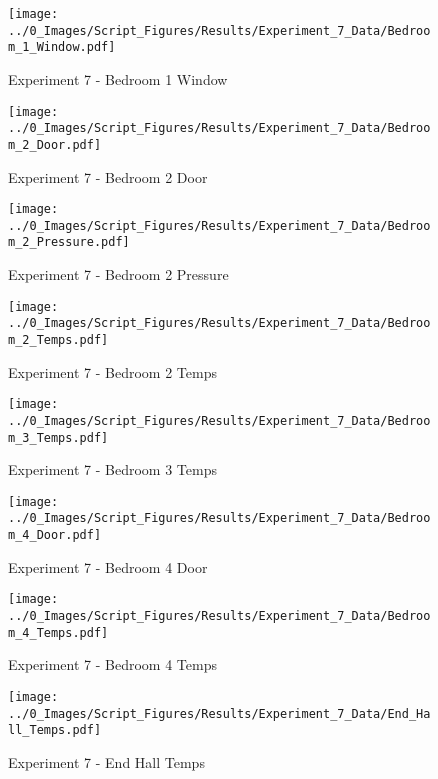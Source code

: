 	\clearpage

	\begin{figure}[H]
		\centering
		\texttt{[image: ../0\_Images/Script\_Figures/Results/Experiment\_7\_Data/Bedroom\_1\_Window.pdf]}
		\caption[]{Experiment 7 - Bedroom 1 Window}
	\end{figure}
 

	\begin{figure}[H]
		\centering
		\texttt{[image: ../0\_Images/Script\_Figures/Results/Experiment\_7\_Data/Bedroom\_2\_Door.pdf]}
		\caption[]{Experiment 7 - Bedroom 2 Door}
	\end{figure}
 
	\clearpage

	\begin{figure}[H]
		\centering
		\texttt{[image: ../0\_Images/Script\_Figures/Results/Experiment\_7\_Data/Bedroom\_2\_Pressure.pdf]}
		\caption[]{Experiment 7 - Bedroom 2 Pressure}
	\end{figure}
 

	\begin{figure}[H]
		\centering
		\texttt{[image: ../0\_Images/Script\_Figures/Results/Experiment\_7\_Data/Bedroom\_2\_Temps.pdf]}
		\caption[]{Experiment 7 - Bedroom 2 Temps}
	\end{figure}
 
	\clearpage

	\begin{figure}[H]
		\centering
		\texttt{[image: ../0\_Images/Script\_Figures/Results/Experiment\_7\_Data/Bedroom\_3\_Temps.pdf]}
		\caption[]{Experiment 7 - Bedroom 3 Temps}
	\end{figure}
 

	\begin{figure}[H]
		\centering
		\texttt{[image: ../0\_Images/Script\_Figures/Results/Experiment\_7\_Data/Bedroom\_4\_Door.pdf]}
		\caption[]{Experiment 7 - Bedroom 4 Door}
	\end{figure}
 
	\clearpage

	\begin{figure}[H]
		\centering
		\texttt{[image: ../0\_Images/Script\_Figures/Results/Experiment\_7\_Data/Bedroom\_4\_Temps.pdf]}
		\caption[]{Experiment 7 - Bedroom 4 Temps}
	\end{figure}
 

	\begin{figure}[H]
		\centering
		\texttt{[image: ../0\_Images/Script\_Figures/Results/Experiment\_7\_Data/End\_Hall\_Temps.pdf]}
		\caption[]{Experiment 7 - End Hall Temps}
	\end{figure}
 
